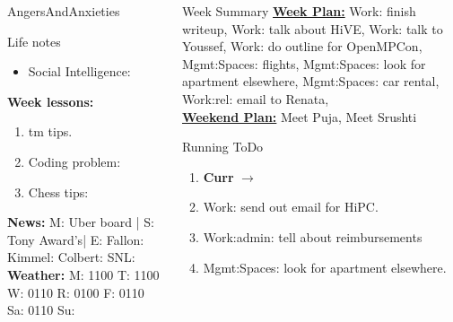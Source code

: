 \begin{columns}
\begin{column}{0.20\linewidth}
\begin{block}{AngersAndAnxieties}
\begin{itemize}
      \end{itemize}
    \end{block}
      \begin{block}{Life notes}
        \begin{itemize}
          \tiny \item \tiny Social Intelligence: 
        \end{itemize}
      \end{block}
      \begin{block}
        {\tiny {\bf Week lessons:}}
        \begin{enumerate}
        \item \tiny tm tips.
        \item \tiny Coding problem: 
        \item \tiny Chess tips: 
        \end{enumerate}
            {{\tiny {\tiny \bf  News:}} {\tiny  M: Uber board | S:
                Tony Award's| E: Fallon:  Kimmel:  Colbert: SNL:}}
            {{\tiny {\tiny \bf  Weather:}} {\tiny M: 1100 T: 1100 W:
                0110 R: 0100 F: 0110 Sa: 0110 Su: }}
      \end{block}
  \end{column}
  \begin{column}{0.6\linewidth}
    \begin{block}{Week Summary} 
      {\underline {\bf Week Plan:} 
        Work: finish writeup, Work: talk about HiVE, Work: talk to
        Youssef, Work: do outline for OpenMPCon, 
        Mgmt:Spaces: flights,  Mgmt:Spaces: look for apartment
        elsewhere, Mgmt:Spaces: car rental, 
        Work:rel: email to Renata, } \\
      {\underline{\bf Weekend Plan:} Meet Puja, Meet Srushti }\\
    \end{block}

      \begin{block}{Running ToDo} %
        \begin{enumerate} 
        \tiny \item \tiny \textbf{Curr} $\rightarrow$ 
        \item \tiny Work: send out email for HiPC.
        \item \tiny Work:admin: tell about reimbursements 
        \item \tiny  Mgmt:Spaces: look for apartment elsewhere. 


\end{enumerate}
\end{block}
\end{column}
\end{columns}
